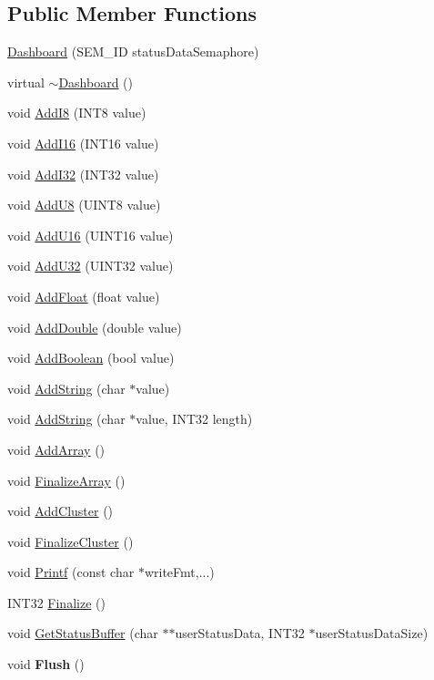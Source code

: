 \subsection*{Public Member Functions}
\begin{DoxyCompactItemize}
\item 
\hyperlink{classDashboard_aa424d4887cf702e75073a88a7ac4d0a7}{Dashboard} (SEM\_\-ID statusDataSemaphore)
\item 
virtual \hyperlink{classDashboard_a43a9becd0adb8641b81174de35842690}{$\sim$Dashboard} ()
\item 
void \hyperlink{classDashboard_ac568575b3dbece4aae029e82c5397238}{AddI8} (INT8 value)
\item 
void \hyperlink{classDashboard_a3d2314c2e037b8e37351796a09aa31d1}{AddI16} (INT16 value)
\item 
void \hyperlink{classDashboard_ac1e993c3851ecc7f20917efb56673959}{AddI32} (INT32 value)
\item 
void \hyperlink{classDashboard_a640538e7f8d38d9fe920ebcf7be46557}{AddU8} (UINT8 value)
\item 
void \hyperlink{classDashboard_ae9bad9b10e49d30da5fa94d74f074d1c}{AddU16} (UINT16 value)
\item 
void \hyperlink{classDashboard_a91962630887557f93fa4515d4a28ebf0}{AddU32} (UINT32 value)
\item 
void \hyperlink{classDashboard_a948fb34947acc01880f7d5eacec8cd2d}{AddFloat} (float value)
\item 
void \hyperlink{classDashboard_a0e780e771771b87659c4055607056e11}{AddDouble} (double value)
\item 
void \hyperlink{classDashboard_ad082687e911a3267badaa34b40ee022c}{AddBoolean} (bool value)
\item 
void \hyperlink{classDashboard_abee599f0ea1db73228f3f3361affa746}{AddString} (char $\ast$value)
\item 
void \hyperlink{classDashboard_a63eb885d150b0bc230659f6304a80efc}{AddString} (char $\ast$value, INT32 length)
\item 
void \hyperlink{classDashboard_a1c200071216fc4bc5ca479e76b8d6d4d}{AddArray} ()
\item 
void \hyperlink{classDashboard_af4d1fe589d5b503afc9017fbb072114a}{FinalizeArray} ()
\item 
void \hyperlink{classDashboard_ae2967a58621c393b6afd58324801933f}{AddCluster} ()
\item 
void \hyperlink{classDashboard_aeca81fb65e4bb515b60eb55aa7c6aea5}{FinalizeCluster} ()
\item 
void \hyperlink{classDashboard_af6090d34e555c1fd33e8a6e0d3fec733}{Printf} (const char $\ast$writeFmt,...)
\item 
INT32 \hyperlink{classDashboard_a033de13c5a7165c3455e7ec52115167c}{Finalize} ()
\item 
void \hyperlink{classDashboard_aeebae45281f0cfdb41f2085d9b55bcea}{GetStatusBuffer} (char $\ast$$\ast$userStatusData, INT32 $\ast$userStatusDataSize)
\item 
\hypertarget{classDashboard_a29364210709cd218cb22d8455923a853}{
void {\bfseries Flush} ()}
\label{classDashboard_a29364210709cd218cb22d8455923a853}


\end{DoxyCompactItemize}
